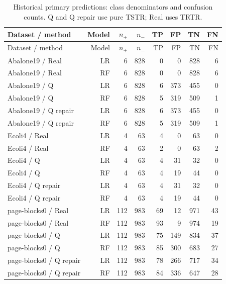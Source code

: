 \begin{longtable}{lrrrrrrr}
\caption{Historical primary predictions: class denominators and confusion counts. Q and Q repair use pure TSTR; Real uses TRTR.}\label{tab:confusions}\\
\toprule
Dataset / method & Model & $n_+$ & $n_-$ & TP & FP & TN & FN \\
\midrule\endfirsthead
\toprule
Dataset / method & Model & $n_+$ & $n_-$ & TP & FP & TN & FN \\
\midrule\endhead
Abalone19 / Real & LR & 6 & 828 & 0 & 0 & 828 & 6 \\
Abalone19 / Real & RF & 6 & 828 & 0 & 0 & 828 & 6 \\
Abalone19 / Q & LR & 6 & 828 & 6 & 373 & 455 & 0 \\
Abalone19 / Q & RF & 6 & 828 & 5 & 319 & 509 & 1 \\
Abalone19 / Q repair & LR & 6 & 828 & 6 & 373 & 455 & 0 \\
Abalone19 / Q repair & RF & 6 & 828 & 5 & 319 & 509 & 1 \\
Ecoli4 / Real & LR & 4 & 63 & 4 & 0 & 63 & 0 \\
Ecoli4 / Real & RF & 4 & 63 & 2 & 0 & 63 & 2 \\
Ecoli4 / Q & LR & 4 & 63 & 4 & 31 & 32 & 0 \\
Ecoli4 / Q & RF & 4 & 63 & 4 & 19 & 44 & 0 \\
Ecoli4 / Q repair & LR & 4 & 63 & 4 & 31 & 32 & 0 \\
Ecoli4 / Q repair & RF & 4 & 63 & 4 & 19 & 44 & 0 \\
page-blocks0 / Real & LR & 112 & 983 & 69 & 12 & 971 & 43 \\
page-blocks0 / Real & RF & 112 & 983 & 93 & 9 & 974 & 19 \\
page-blocks0 / Q & LR & 112 & 983 & 75 & 149 & 834 & 37 \\
page-blocks0 / Q & RF & 112 & 983 & 85 & 300 & 683 & 27 \\
page-blocks0 / Q repair & LR & 112 & 983 & 78 & 266 & 717 & 34 \\
page-blocks0 / Q repair & RF & 112 & 983 & 84 & 336 & 647 & 28 \\
\bottomrule\end{longtable}
